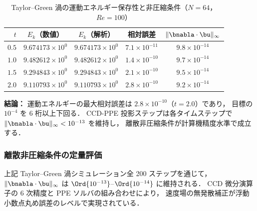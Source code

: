 \begin{table}[htbp]
\centering
\caption{Taylor--Green 渦の運動エネルギー保存性と非圧縮条件（$N=64$，$\mathit{Re}=100$）}
\label{tab:tgv_energy}
\renewcommand{\arraystretch}{1.3}
\begin{tabular}{rcccc}
\toprule
$t$ & $E_k$（数値） & $E_k$（解析） & 相対誤差 & $\|\bnabla\cdot\bu\|_\infty$ \\
\midrule
$0.5$ & $9.674173 \times 10^{0}$ & $9.674173 \times 10^{0}$ & $7.1 \times 10^{-11}$ & $9.8 \times 10^{-14}$ \\
$1.0$ & $9.482612 \times 10^{0}$ & $9.482612 \times 10^{0}$ & $1.4 \times 10^{-10}$ & $9.7 \times 10^{-14}$ \\
$1.5$ & $9.294843 \times 10^{0}$ & $9.294843 \times 10^{0}$ & $2.1 \times 10^{-10}$ & $9.5 \times 10^{-14}$ \\
$2.0$ & $9.110793 \times 10^{0}$ & $9.110793 \times 10^{0}$ & $2.8 \times 10^{-10}$ & $9.2 \times 10^{-14}$ \\
\bottomrule
\end{tabular}
\end{table}

\noindent\textbf{結論：}
運動エネルギーの最大相対誤差は $2.8 \times 10^{-10}$（$t = 2.0$）であり，
目標の $10^{-4}$ を 6 桁以上下回る．
CCD-PPE 投影ステップは各タイムステップで
$\|\bnabla\cdot\bu\|_\infty < 10^{-13}$ を維持し，
離散非圧縮条件が計算機精度水準で成立する．

\subsubsection{離散非圧縮条件の定量評価}
\label{sec:div_free}

上記 Taylor--Green 渦シミュレーション全 200 ステップを通じて，
$\|\bnabla\cdot\bu\|_\infty$ は $\Ord{10^{-13}}$--$\Ord{10^{-14}}$ に維持される．
CCD 微分演算子の 6 次精度と PPE ソルバの組み合わせにより，
速度場の無発散補正が浮動小数点丸め誤差のレベルで実現されている．
